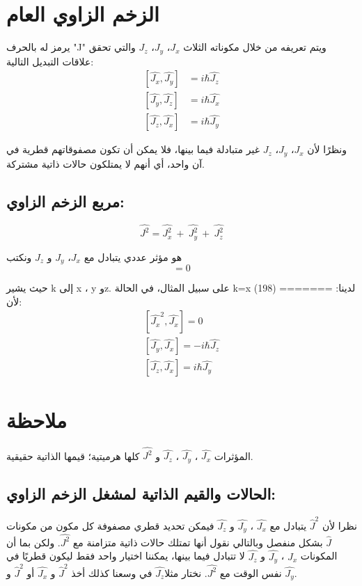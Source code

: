 \section{الزخم الزاوي العام}
يرمز له بالحرف "J" ويتم تعريفه من خلال مكوناته الثلاث
${J}_x$، ${J}_y$، ${J}_z$
والتي تحقق علاقات التبديل التالية:
\begin{equation}
	\begin{aligned}
		[\hat{J_{x}}, \hat{J_{y}}] & =  i\hbar \hat{J_{z}}  \\
		[\hat{J_{y}}, \hat{J_{z}}] & =  i\hbar \hat{J_{x}} \\
		[\hat{J_{z}}, \hat{J_{x}}] & =  i\hbar \hat{J_{y}} 
	\end{aligned}
\end{equation}

	
	ونظرًا لأن ${J}_x$، ${J}_y$، ${J}_z$ غير متبادلة فيما بينها، فلا يمكن أن تكون مصفوقاتهم قطرية في آن واحد، أي أنهم لا يمتلكون حالات ذاتية مشتركة.  
\subsection*{مربع الزخم الزاوي:}


\begin{equation}
\hat{J^{2}} = \hat{J_{x}^{2}} ~+ ~\hat{J_{y}^{2}} ~+~ \hat{J_{z}^{2}}
\end{equation}

	هو مؤثر عددي يتبادل مع
	   ${J}_x$، ${J}_y$ و ${J}_z$ ونكتب
\begin{equation}	
	    [\hat{J}^{2}, \hat{J_{k}} ]=0
	\end{equation}


	حيث يشير k إلى  x ، y وz. على سبيل المثال، في الحالة k=x لدينا:
	======= (198)
لأن:
 \begin{equation}
 		\begin{aligned}
 	    [\hat{J_{x}}^{2}, \hat{J_{x}} ]=0\\
    	[\hat{J_{y}}, \hat{J_{x}}]  =  -i\hbar \hat{J_{z}} \\
        [\hat{J_{z}}, \hat{J_{x}}]  =  i\hbar \hat{J_{y}} 	\end{aligned}
\end{equation}
\section*{ملاحظة}

	المؤثرات  $\hat{J_{x}}$ ، $\hat{J_{y}}$ ، $\hat{J_{z}}$ و
	$\hat{J^{2}}$ كلها هرميتية؛ قيمها الذاتية حقيقية. 
\subsection*{الحالات والقيم الذاتية لمشغل الزخم الزاوي:}
نظرا لأن $\hat{J}^{2}$ يتبادل مع   $\hat{J_{x}}$ ، $\hat{J_{y}}$ و $\hat{J_{z}}$ 
فيمكن تحديد قطري مصفوفة كل مكون من مكونات $\hat{J}$ بشكل منفصل وبالتالي نقول أنها تمتلك حالات ذاتية متزامنة مع $\hat{J^{2}}$.  ولكن بما أن المكونات  $\hat{J_{x}}$ ، $\hat{J_{y}}$ و $\hat{J_{z}}$ 
لا تتبادل فيما بينها، يمكننا اختيار واحد فقط ليكون قطريًا في نفس الوقت مع $\hat{J^{2}}$. نختار مثلا$\hat{J_{z}}$ 
 في وسعنا كذلك أخذ $\hat{J}^{2}$ و $\hat{J_{x}}$ أو $\hat{J}^{2}$  و $\hat{J_{y}}$.
 

